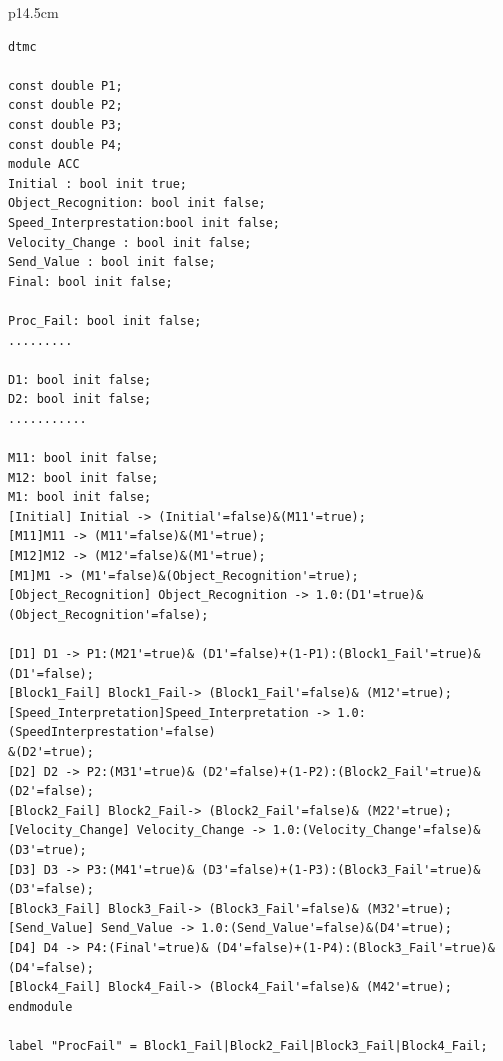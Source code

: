 \documentclass[3p,times,procedia,authoryear,round]{elsarticle}
\begin{document}
  	
  	\begin{table}[!ht]

  			\begin{center}


  			\begin{tabular}{ p{14.5cm} }
  	\begin{lstlisting}
dtmc

const double P1;
const double P2;
const double P3;
const double P4;
module ACC
Initial : bool init true;
Object_Recognition: bool init false;
Speed_Interprestation:bool init false;
Velocity_Change : bool init false;
Send_Value : bool init false;
Final: bool init false;

Proc_Fail: bool init false; 
.........

D1: bool init false;
D2: bool init false;
...........

M11: bool init false;
M12: bool init false;		
M1: bool init false;		
[Initial] Initial -> (Initial'=false)&(M11'=true);
[M11]M11 -> (M11'=false)&(M1'=true);		
[M12]M12 -> (M12'=false)&(M1'=true);		
[M1]M1 -> (M1'=false)&(Object_Recognition'=true);		
[Object_Recognition] Object_Recognition -> 1.0:(D1'=true)&
(Object_Recognition'=false);

[D1] D1 -> P1:(M21'=true)& (D1'=false)+(1-P1):(Block1_Fail'=true)&(D1'=false);
[Block1_Fail] Block1_Fail-> (Block1_Fail'=false)& (M12'=true);		
[Speed_Interpretation]Speed_Interpretation -> 1.0:(SpeedInterprestation'=false)
&(D2'=true);		
[D2] D2 -> P2:(M31'=true)& (D2'=false)+(1-P2):(Block2_Fail'=true)&(D2'=false);
[Block2_Fail] Block2_Fail-> (Block2_Fail'=false)& (M22'=true);	
[Velocity_Change] Velocity_Change -> 1.0:(Velocity_Change'=false)&
(D3'=true);		
[D3] D3 -> P3:(M41'=true)& (D3'=false)+(1-P3):(Block3_Fail'=true)&(D3'=false);
[Block3_Fail] Block3_Fail-> (Block3_Fail'=false)& (M32'=true);	
[Send_Value] Send_Value -> 1.0:(Send_Value'=false)&(D4'=true);		
[D4] D4 -> P4:(Final'=true)& (D4'=false)+(1-P4):(Block3_Fail'=true)&(D4'=false);
[Block4_Fail] Block4_Fail-> (Block4_Fail'=false)& (M42'=true);		
endmodule 

label "ProcFail" = Block1_Fail|Block2_Fail|Block3_Fail|Block4_Fail; \end{lstlisting} 	


\\


\end{tabular}

            
                \end{center}
\end{table}
\normalsize
\end{document}
